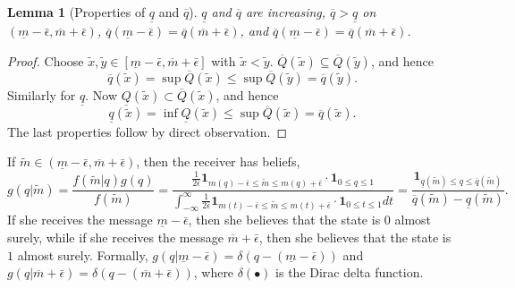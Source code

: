 \documentclass[12pt]{article}
\newtheorem{lemma}{Lemma}
\begin{document}
\begin{lemma}[Properties of $\underline{q}$ and $\overline{q}$]\label{lemma:props}
$\underline{q}$ and $\overline{q}$ are increasing, $\overline{q}>\underline{q}$ on $(\underline{m}-\bar{\epsilon},\overline{m}+\bar{\epsilon})$, $\overline{q}(\underline{m}-\bar{\epsilon})=\overline{q}(\overline{m}+\bar{\epsilon})$, and $\overline{q}(\underline{m}-\bar{\epsilon})=\overline{q}(\overline{m}+\bar{\epsilon})$.
\end{lemma}
\begin{proof}
Choose $\tilde{x},\tilde{y}\in[\underline{m}-\bar{\epsilon},\overline{m}+\bar{\epsilon}]$ with $\tilde{x}<\tilde{y}$. $\overline{Q}(\tilde{x})\subseteq\overline{Q}(\tilde{y})$, and hence 
\begin{equation}
\overline{q}(\tilde{x})=\sup\overline{Q}(\tilde{x})\leq\sup\overline{Q}(\tilde{y})=\overline{q}(\tilde{y}).
\end{equation} 
Similarly for $\underline{q}$. Now $\underline{Q}(\tilde{x})\subset\overline{Q}(\tilde{x})$, and hence
\begin{equation}
\underline{q}(\tilde{x})=\inf\underline{Q}(\tilde{x})\leq\sup\overline{Q}(\tilde{x})=\overline{q}(\tilde{x}).
\end{equation}
The last properties follow by direct observation.  
\end{proof}

\noindent If $\tilde{m}\in(\underline{m}-\bar{\epsilon},\overline{m}+\bar{\epsilon})$, then the receiver has beliefs, 
\begin{equation}
g(q|\tilde{m})=\frac{f(\tilde{m}|q)g(q)}{f(\tilde{m})}=\frac{\frac{1}{2\bar{\epsilon}}\mathbf{1}_{m(q)-\bar{\epsilon}\leq\tilde{m}\leq m(q)+\bar{\epsilon}}\cdot\mathbf{1}_{0\leq q\leq 1}}{\int_{-\infty}^{\infty}{\frac{1}{2\bar{\epsilon}}\mathbf{1}_{m(t)-\bar{\epsilon}\leq\tilde{m}\leq m(t)+\bar{\epsilon}}\cdot\mathbf{1}_{0\leq t\leq 1}}dt}=\frac{\mathbf{1}_{\underline{q}(\tilde{m})\leq q\leq\overline{q}(\tilde{m})}}{\overline{q}(\tilde{m})-\underline{q}(\tilde{m})}.
\end{equation}
If she receives the message $\underline{m}-\bar{\epsilon}$, then she believes that the state is $0$ almost surely, while if she receives the message $\overline{m}+\bar{\epsilon}$, then she believes that the state is $1$ almost surely. Formally, $g(q|\underline{m}-\bar{\epsilon})=\delta(q-(\underline{m}-\bar{\epsilon}))$ and $g(q|\overline{m}+\bar{\epsilon})=\delta(q-(\overline{m}+\bar{\epsilon}))$, where $\delta(\bullet)$ is the Dirac delta function.
\end{document}
